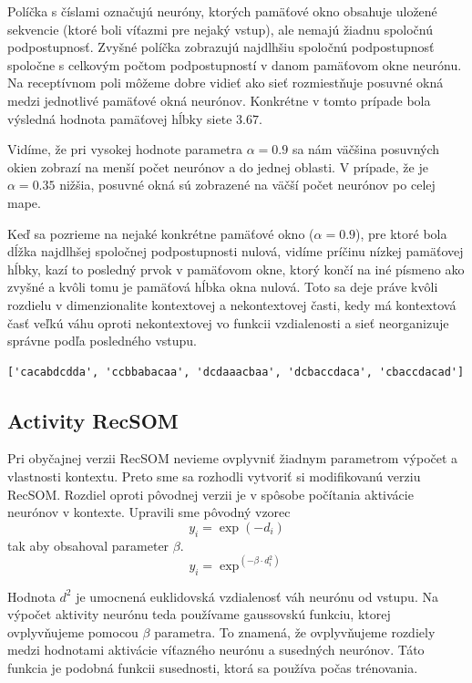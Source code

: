 Políčka s číslami označujú neuróny, ktorých pamäťové okno obsahuje uložené sekvencie (ktoré boli víťazmi pre nejaký vstup), ale nemajú žiadnu 
spoločnú podpostupnosť.
Zvyšné políčka zobrazujú najdlhšiu spoločnú podpostupnosť spoločne s celkovým počtom podpostupností 
v danom pamäťovom okne neurónu. Na receptívnom poli môžeme dobre vidieť ako sieť rozmiestňuje posuvné okná medzi jednotlivé pamäťové okná neurónov.
Konkrétne v tomto prípade bola výsledná hodnota pamäťovej hĺbky siete $3.67$.

Vidíme, že pri vysokej hodnote parametra $\alpha = 0.9$ sa nám väčšina posuvných okien zobrazí na menší počet neurónov a do jednej 
oblasti. V prípade, že je $\alpha = 0.35$ nižšia, posuvné okná sú zobrazené na väčší počet neurónov po celej mape.

Keď sa pozrieme na nejaké konkrétne pamäťové okno ($\alpha = 0.9$), pre ktoré bola dĺžka najdlhšej spoločnej podpostupnosti nulová, 
vidíme príčinu nízkej pamäťovej hĺbky, kazí to posledný 
prvok v pamäťovom okne, ktorý končí na iné písmeno ako zvyšné a kvôli tomu je pamäťová hĺbka okna nulová.
Toto sa deje práve kvôli rozdielu v dimenzionalite kontextovej a nekontextovej časti, kedy má kontextová časť veľkú váhu oproti nekontextovej vo funkcii vzdialenosti a sieť neorganizuje správne podľa posledného vstupu.

\begin{lstlisting}[basicstyle=\footnotesize]
['cacabdcdda', 'ccbbabacaa', 'dcdaaacbaa', 'dcbaccdaca', 'cbaccdacad']
\end{lstlisting}

\subsection{Activity RecSOM}
Pri obyčajnej verzii RecSOM nevieme ovplyvniť žiadnym parametrom výpočet a vlastnosti kontextu. 
Preto sme sa rozhodli vytvoriť si modifikovanú verziu RecSOM. Rozdiel oproti pôvodnej verzii je v spôsobe počítania 
aktivácie neurónov v kontexte. 
Upravili sme pôvodný vzorec 
\begin{equation}
    y_{i} = \exp{(-d_{i})}
\end{equation}
tak aby obsahoval parameter $\beta$.
\begin{equation}
    y_{i} = \exp^{(-\beta \cdot d_{i}^2)}
\end{equation}

Hodnota $d^2$ je umocnená euklidovská vzdialenosť váh neurónu od vstupu.
Na výpočet aktivity neurónu teda používame gaussovskú funkciu, ktorej  ovplyvňujeme
pomocou $\beta$ parametra. To znamená, že ovplyvňujeme rozdiely medzi hodnotami aktivácie víťazného neurónu
a susedných neurónov. Táto funkcia je podobná funkcii susednosti, ktorá sa používa počas trénovania. 

